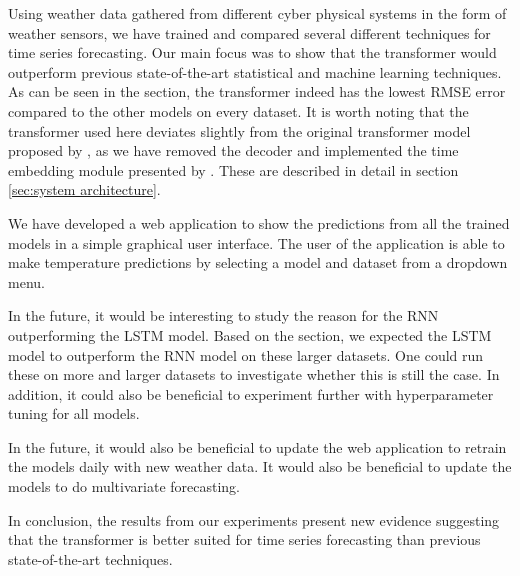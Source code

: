 Using weather data gathered from different cyber physical systems in the form of weather sensors, we have trained and compared several different techniques for time series forecasting.
Our main focus was to show that the transformer would outperform previous state-of-the-art statistical and machine learning techniques.
As can be seen in the  section, the transformer indeed has the lowest RMSE error compared to the other models on every dataset. 
It is worth noting that the transformer used here deviates slightly from the original transformer model proposed by \citet{AttentionIsAllYouNeed}, as we have removed the decoder and implemented the time embedding module presented by \citet{time2vec}.
These are described in detail in section \ref{sec:system architecture}.

We have developed a web application to show the predictions from all the trained models in a simple graphical user interface. 
The user of the application is able to make temperature predictions by selecting a model and dataset from a dropdown menu. 

In the future, it would be interesting to study the reason for the RNN outperforming the LSTM model.
Based on the  section, we expected the LSTM model to outperform the RNN model on these larger datasets.
One could run these on more and larger datasets to investigate whether this is still the case. 
In addition, it could also be beneficial to experiment further with hyperparameter tuning for all models.

In the future, it would also be beneficial to update the web application to retrain the models daily with new weather data. 
It would also be beneficial to update the models to do multivariate forecasting.

In conclusion, the results from our experiments present new evidence suggesting that the transformer is better suited for time series forecasting than previous state-of-the-art techniques.